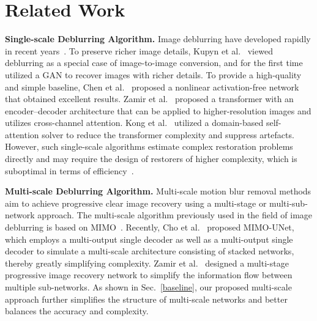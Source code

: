 \documentclass[10pt,twocolumn,letterpaper]{article}
\begin{document}
\section{Related Work}
\textbf{Single-scale Deblurring Algorithm.}
Image deblurring have developed rapidly in recent years~\cite{kupyn2018deblurgan,zhang2020deblurring,zhang2019deep,chen2022simple,kong2023efficient,li2023efficient}. To preserve richer image details, Kupyn et al.~\cite{kupyn2018deblurgan} viewed deblurring as a special case of image-to-image conversion, and for the first time utilized a GAN to recover images with richer details. To provide a high-quality and simple baseline, Chen et al.~\cite{chen2022simple} proposed a nonlinear activation-free network that obtained excellent results. Zamir et al.~\cite{zamir2022restormer} proposed a transformer with an encoder–decoder architecture that can be applied to higher-resolution images and utilizes cross-channel attention. Kong et al.~\cite{kong2023efficient} utilized a domain-based self-attention solver to reduce the transformer complexity and suppress artefacts. However, such single-scale algorithms estimate complex restoration problems directly and may require the design of restorers of higher complexity, which is suboptimal in terms of efficiency~\cite{kim2022mssnet}.

\noindent\textbf{Multi-scale Deblurring Algorithm.}
Multi-scale motion blur removal methods aim to achieve progressive clear image recovery using a multi-stage or multi-sub-network approach. The multi-scale algorithm previously used in the field of image deblurring is based on MIMO~\cite{nah2017deep,tao2018scale,park2020multi,cho2021rethinking,li2022learning}. Recently, Cho et al.~\cite{cho2021rethinking} proposed MIMO-UNet, which employs a multi-output single decoder as well as a multi-output single decoder to simulate a multi-scale architecture consisting of stacked networks, thereby greatly simplifying complexity. Zamir et al.~\cite{zamir2021multi} designed a multi-stage progressive image recovery network to simplify the information flow between multiple sub-networks. As shown in Sec.~\ref{baseline}, our proposed multi-scale approach further simplifies the structure of multi-scale networks and better balances the accuracy and complexity.
\end{document}
